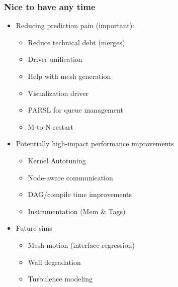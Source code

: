 \begin{frame}\frametitle{Nice to have any time}
\begin{multicols}{2}
\begin{itemize}
\item Reducing prediction pain (important):
  \begin{itemize}
  \item Reduce technical debt (merges)
  \item Driver unification
  \item Help with mesh generation
  \item Visualization driver
  \item PARSL for queue management
  \item M-to-N restart
  \end{itemize}
\item Potentially high-impact performance improvements
  \begin{itemize}
  \item Kernel Autotuning 
  \item Node-aware communication 
  \item DAG/compile time improvements 
  \item Instrumentation (Mem \& Tags) 
  \end{itemize}
\item Future sims
  \begin{itemize}
  \item Mesh motion (interface regression)
  \item Wall degradation
  \item Turbulence modeling
  \end{itemize}
\end{itemize}
\end{multicols}
\end{frame}



